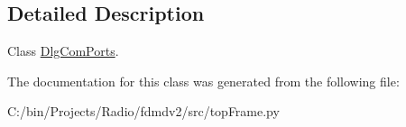 \subsection{Detailed Description}
Class \hyperlink{classtop_frame_1_1_dlg_com_ports}{Dlg\-Com\-Ports}. 

The documentation for this class was generated from the following file\-:\begin{DoxyCompactItemize}
\item 
C\-:/bin/\-Projects/\-Radio/fdmdv2/src/top\-Frame.\-py\end{DoxyCompactItemize}
